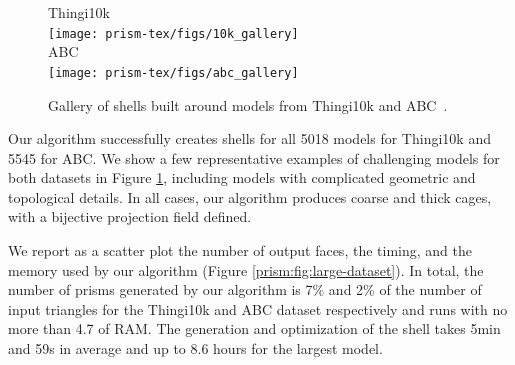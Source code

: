 
\begin{figure}
    \centering
    Thingi10k\\
    \texttt{[image: prism-tex/figs/10k\_gallery]}\\%
    ABC\\
    \texttt{[image: prism-tex/figs/abc\_gallery]}
    \caption{Gallery of shells built around models from Thingi10k \protect\cite{zhou2016thingi10k} and ABC~\protect\cite{koch2019abc}.}
    \label{prism:fig:gallery}
    
\end{figure}


Our algorithm successfully creates shells for all 5018 models for Thingi10k and 5545 for ABC. 
We show a few representative examples of challenging models for both datasets in Figure \ref{prism:fig:gallery}, including models with complicated geometric and topological details. In all cases, our algorithm produces coarse and thick cages, with a bijective projection field defined.

We report as a scatter plot the number of output faces, the timing, and the memory used by our algorithm (Figure \ref{prism:fig:large-dataset}).
In total, the number of prisms generated by our algorithm is 7\% and 2\% of the number of input triangles for the Thingi10k and ABC dataset respectively 
and runs with no more than 4.7  of RAM. 
The generation and optimization of the shell takes 5min and 59s in average and up to 8.6 hours for the largest model. 

